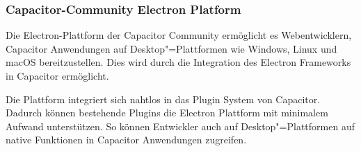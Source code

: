 \subsubsection{Capacitor-Community Electron Platform}

Die Electron-Plattform der Capacitor Community ermöglicht es Webentwicklern, Capacitor Anwendungen auf Desktop"=Plattformen wie Windows, Linux und macOS bereitzustellen.
Dies wird durch die Integration des Electron Frameworks in Capacitor ermöglicht.
\cite{capacitor-electron}

Die Plattform integriert sich nahtlos in das Plugin System von Capacitor.~\cite{capacitor-electron}
Dadurch können bestehende Plugins die Electron Plattform mit minimalem Aufwand unterstützen.
So können Entwickler auch auf Desktop"=Plattformen auf native Funktionen in Capacitor Anwendungen zugreifen.
